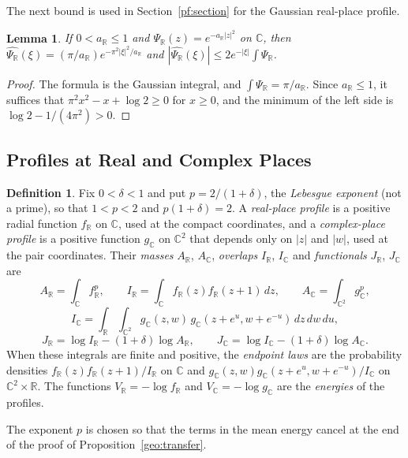 \documentclass[11pt]{amsart}
\numberwithin{equation}{section}
\newtheorem{lemma}[equation]{Lemma}
\theoremstyle{definition}
\newtheorem{definition}[equation]{Definition}
\theoremstyle{remark}
\newcommand{\R}{\mathbb R}
\newcommand{\C}{\mathbb C}
\begin{document}
The next bound is used in Section~\ref{pf:section} for the Gaussian
real-place profile.

\begin{lemma}\label{geo:gaussian}
If $0<a_\R\le1$ and $\Psi_\R(z)=e^{-a_\R|z|^2}$ on $\C$, then
$\widehat{\Psi_\R}(\xi)=(\pi/a_\R)e^{-\pi^2|\xi|^2/a_\R}$ and
$|\widehat{\Psi_\R}(\xi)|\le2e^{-|\xi|}\int\Psi_\R$.
\end{lemma}

\begin{proof}
The formula is the Gaussian integral, and $\int\Psi_\R=\pi/a_\R$. Since
$a_\R\le1$, it suffices that $\pi^2x^2-x+\log2\ge0$ for $x\ge0$, and the
minimum of the left side is $\log2-1/(4\pi^2)>0$.
\end{proof}

\subsection{Profiles at Real and Complex Places}

\begin{definition}\label{geo:profiles}
Fix $0<\delta<1$ and put $p=2/(1+\delta)$, the \emph{Lebesgue exponent}
(not a prime), so that $1<p<2$ and $p(1+\delta)=2$. A \emph{real-place
profile} is a positive radial function $f_\R$ on $\C$, used at the compact
coordinates, and a \emph{complex-place profile} is a positive function
$g_\C$ on $\C^2$ that depends only on $|z|$ and $|w|$, used at the pair
coordinates. Their \emph{masses} $A_\R$, $A_\C$, \emph{overlaps} $I_\R$,
$I_\C$ and \emph{functionals} $J_\R$, $J_\C$ are
\[
 A_\R=\int_\C f_\R^p,\qquad I_\R=\int_\C f_\R(z)f_\R(z+1)\,dz,
 \qquad A_\C=\int_{\C^2}g_\C^p,
\]
\[
 I_\C=\int_\R\int_{\C^2}g_\C(z,w)\,g_\C(z+e^u,w+e^{-u})\,dz\,dw\,du,
\]
\[
 J_\R=\log I_\R-(1+\delta)\log A_\R,\qquad
 J_\C=\log I_\C-(1+\delta)\log A_\C.
\]
When these integrals are finite and positive, the \emph{endpoint laws}
are the probability densities $f_\R(z)f_\R(z+1)/I_\R$ on $\C$ and
$g_\C(z,w)g_\C(z+e^u,w+e^{-u})/I_\C$ on $\C^2\times\R$. The functions
$V_\R=-\log f_\R$ and $V_\C=-\log g_\C$ are the \emph{energies} of the
profiles.
\end{definition}

The exponent $p$ is chosen so that the terms in the mean energy cancel at
the end of the proof of Proposition~\ref{geo:transfer}.
\end{document}
